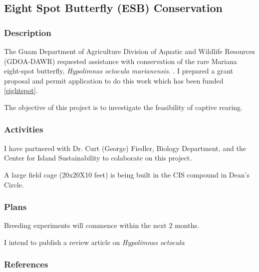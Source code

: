 \subsection{Eight Spot Butterfly (ESB) Conservation}
\begin{refsection}

\subsubsection{Description}

The Guam Department of Agriculture Division of Aquatic and Wildlife
Resources (GDOA-DAWR) requested assistance with conservation of the
rare Mariana eight-spot butterfly, \emph{Hypolimnas octocula marianensis.
}. I prepared a grant proposal and permit application to do this work \cite{aubrey_moore_application_2016} which has been funded \ref{eightspot}.

The objective of this project is to investigate the feasibility of captive rearing.

\subsubsection{Activities}

I have partnered with Dr. Curt (George) Fiedler, Biology Department, and the Center for Island Sustainability to colaborate on this project.

A large field cage (20x20X10 feet) is being built in the CIS compound in Dean's Circle.

\subsubsection{Plans}

Breeding experiments will commence within the next 2 months.

I intend to publish a review article on \textit{Hypolimnas octocula} \cite{moore_mariana_2013}

\subsubsection{References}
\printbibliography[heading=none]
\end{refsection}

